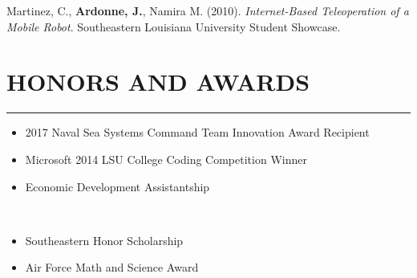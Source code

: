 \documentclass{res}
\begin{document}
\begin{resume}
	\vspace{-0.25in}
	Martinez, C., \textbf{Ardonne, J.}, Namira M. (2010). \textit{Internet-Based Teleoperation of a Mobile Robot}. Southeastern Louisiana University Student Showcase.

	\clearpage


\section{HONORS AND AWARDS}
	\vspace{0.005in}	
	\rule{\textwidth}{0.5pt}
	\vspace{-0.3in}
		\begin{multicols}{2}
			{
				\begin{itemize}
					\item 2017 Naval Sea Systems Command Team Innovation Award Recipient
					\item Microsoft 2014 LSU College Coding Competition Winner
					\item Economic Development Assistantship
				\end{itemize} 
				\ %
				\vspace{-0.175in}
				\begin{itemize}
					\item Southeastern Honor Scholarship
					\item Air Force Math and Science Award
				\end{itemize}
			}
		\end{multicols}	



\end{resume}
\end{document}
